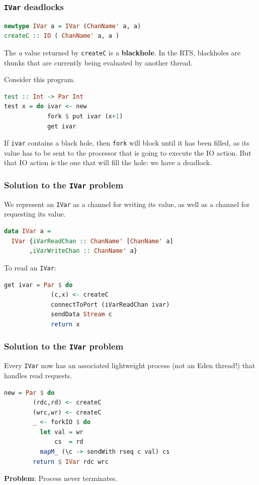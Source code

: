 \documentclass[12pt, danish]{beamer}
\begin{document}
\begin{frame}[fragile]
\frametitle{\texttt{IVar} deadlocks}
\begin{lstlisting}[language=Haskell]
newtype IVar a = IVar (ChanName' a, a)
createC :: IO ( ChanName' a, a )
\end{lstlisting}

The \textit{a} value returned by \texttt{createC} is a
\textbf{blackhole}.  In the RTS, blackholes are thunks that are
currently being evaluated by another thread.\pause

Consider this program.

\begin{lstlisting}[language=Haskell]
test :: Int -> Par Int
test x = do ivar <- new
            fork $ put ivar (x+1)
            get ivar
\end{lstlisting}

If \texttt{ivar} contains a black hole, then \texttt{fork} will block
until it has been filled, as its value has to be sent to the processor
that is going to execute the IO action.  But that IO action is the one
that will fill the hole: we have a deadlock.
\end{frame}

\begin{frame}[fragile]
\frametitle{Solution to the \texttt{IVar} problem}

We represent an \texttt{IVar} as a channel for writing its value, as
well as a channel for requesting its value.

\begin{lstlisting}[language=Haskell]
data IVar a =
  IVar {iVarReadChan :: ChanName' [ChanName' a]
       ,iVarWriteChan :: ChanName' a}
\end{lstlisting}

To read an \texttt{IVar}:

\begin{lstlisting}[language=Haskell]
get ivar = Par $ do
             (c,x) <- createC
             connectToPort (iVarReadChan ivar)
             sendData Stream c
             return x
\end{lstlisting}

\end{frame}

\begin{frame}[fragile]
\frametitle{Solution to the \texttt{IVar} problem}

Every \texttt{IVar} now has an associated lightweight process (not an
Eden thread!) that handles read requests.

\begin{lstlisting}[language=Haskell]
new = Par $ do
        (rdc,rd) <- createC
        (wrc,wr) <- createC
        _ <- forkIO $ do
          let val = wr
              cs  = rd
          mapM_ (\c -> sendWith rseq c val) cs
        return $ IVar rdc wrc
\end{lstlisting}
\pause
\textbf{Problem}: Process never terminates.
\end{frame}
\end{document}
